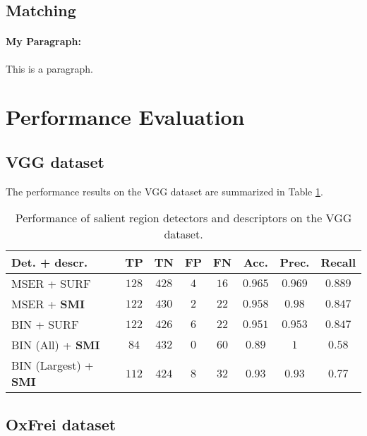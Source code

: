 \documentclass[a4paper,11pt]{article}
\begin{document}
\subsection{Matching}

\paragraph{My Paragraph:} 
This is a paragraph. 

\section{Performance Evaluation}

\subsection{VGG dataset}


The performance results on the VGG dataset are summarized in Table \ref{tab:vgg}.
\begin{table}[!ht]
\begin{center}
\begin{tabular}{|l||c|c|c|c|c|c|c|}

\hline
Det. + descr. & TP & TN & FP & FN & Acc. &Prec. &Recall\\
\hline
\hline
MSER + SURF & $128$ & $428$ &$4$ & $16$ & $0.965$ & $0.969$ & $0.889$\\
\hline
MSER + \bf{SMI} & $122$ &$430$  &$2$  &$22$  &$0.958$  & $0.98$ & $0.847$\\
\hline
BIN + SURF & $122$ & $426$ & $6$ & $22$ & $0.951$ & $0.953$ &$0.847$\\
\hline
BIN (All) + \bf{SMI} &$84$  &$432$  &$0$  &$60$ &$0.89$  & $1$ &$0.58$ \\
\hline
BIN (Largest) + \bf{SMI} &$112$  &$424$  &$8$  &$32$ &$0.93$  & $0.93$ &$0.77$ \\
\hline
\end{tabular}
\end{center}
\vspace{-20pt}
\caption{Performance of salient region detectors and descriptors on the VGG dataset.} \label{tab:vgg}
  \vspace{-10pt}
\end{table}

\subsection{OxFrei dataset}
\end{document}
